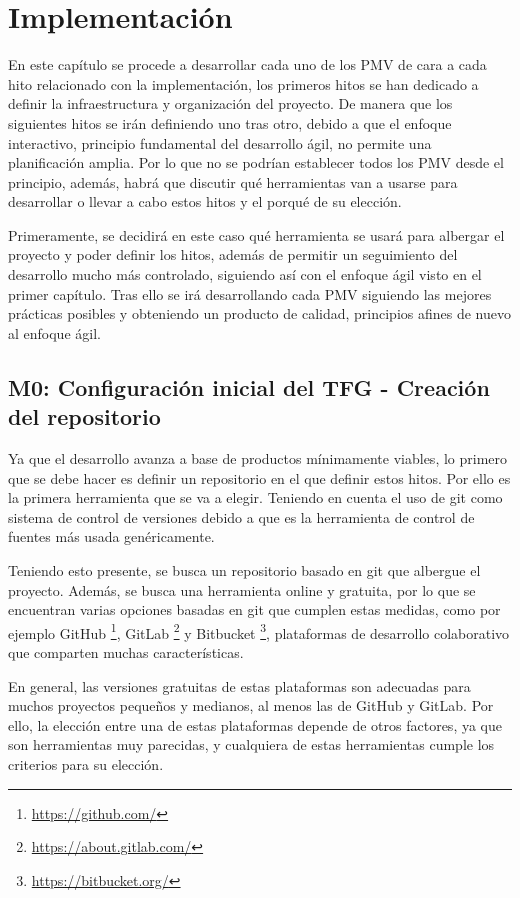 \chapter{Implementación}

En este capítulo se procede a desarrollar cada uno de los PMV de cara a cada hito relacionado con 
la implementación, los primeros hitos se han dedicado a definir la infraestructura y organización del 
proyecto. De manera que los siguientes hitos se irán definiendo uno tras otro, debido a que el enfoque 
interactivo, principio fundamental del desarrollo ágil, no permite una planificación amplia. Por lo que no 
se podrían establecer todos los PMV desde el principio, además, habrá que discutir qué herramientas van a usarse 
para desarrollar o llevar a cabo estos hitos y el porqué de su elección. 

Primeramente, se decidirá en este caso qué herramienta se usará para albergar el proyecto y poder definir los 
hitos, además de permitir un seguimiento del desarrollo mucho más controlado, siguiendo así con el enfoque ágil 
visto en el primer capítulo. Tras ello se irá desarrollando cada PMV siguiendo las mejores prácticas posibles y 
obteniendo un producto de calidad, principios afines de nuevo al enfoque ágil.


\section{M0: Configuración inicial del TFG - Creación del repositorio}

Ya que el desarrollo avanza a base de productos mínimamente viables, lo primero que se
debe hacer es definir un repositorio en el que definir estos hitos. Por ello es la primera herramienta
que se va a elegir. Teniendo en cuenta el uso de git como sistema de control de versiones debido a que es 
la herramienta de control de fuentes más usada genéricamente. 

Teniendo esto presente, se busca un repositorio basado en git que albergue el proyecto. Además, se busca
una herramienta online y gratuita, por lo que se encuentran varias opciones basadas en git que cumplen estas
medidas, como por ejemplo GitHub \footnote{\url{https://github.com/}}, GitLab
\footnote{\url{https://about.gitlab.com/}} y Bitbucket \footnote{\url{https://bitbucket.org/}}, 
plataformas de desarrollo colaborativo que comparten muchas características. 

En general, las versiones gratuitas de estas plataformas son adecuadas para muchos proyectos pequeños y
medianos, al menos las de GitHub y GitLab. Por ello, la elección entre una de estas plataformas depende de 
otros factores, ya que son herramientas muy parecidas, y cualquiera de estas herramientas cumple los criterios
para su elección.

